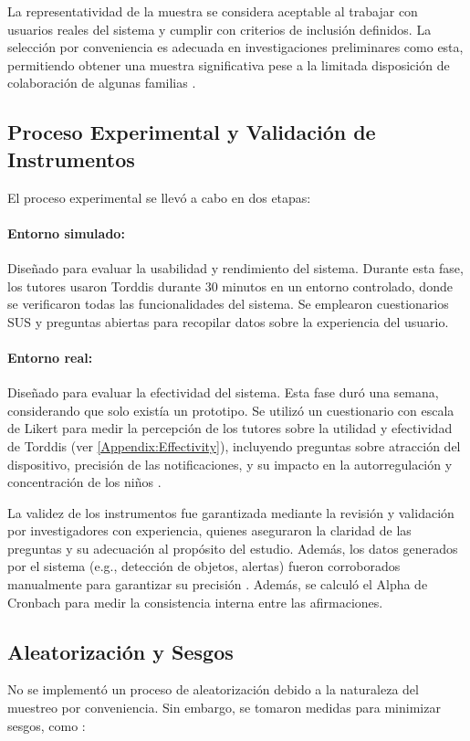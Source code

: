 \documentclass[a4paper,fleqn]{cas-sc}
\begin{document}
			La representatividad de la muestra se considera aceptable al trabajar con usuarios reales del sistema y cumplir con criterios de inclusión definidos. La selección por conveniencia es adecuada en investigaciones preliminares como esta, permitiendo obtener una muestra significativa pese a la limitada disposición de colaboración de algunas familias \citep{DiPietro2025Meta}.
				
		\subsection{Proceso Experimental y Validación de Instrumentos}
			El proceso experimental se llevó a cabo en dos etapas:
				
			\paragraph{Entorno simulado:} Diseñado para evaluar la usabilidad y rendimiento del sistema. Durante esta fase, los tutores usaron Torddis durante 30 minutos en un entorno controlado, donde se verificaron todas las funcionalidades del sistema. Se emplearon cuestionarios SUS y preguntas abiertas para recopilar datos sobre la experiencia del usuario.
			
			\paragraph{Entorno real:} Diseñado para evaluar la efectividad del sistema. Esta fase duró una semana, considerando que solo existía un prototipo. Se utilizó un cuestionario con escala de Likert para medir la percepción de los tutores sobre la utilidad y efectividad de Torddis (ver \ref{Appendix:Effectivity}), incluyendo preguntas sobre atracción del dispositivo, precisión de las notificaciones, y su impacto en la autorregulación y concentración de los niños \citep{Ackermans2025Young}.
				
			La validez de los instrumentos fue garantizada mediante la revisión y validación por investigadores con experiencia, quienes aseguraron la claridad de las preguntas y su adecuación al propósito del estudio. Además, los datos generados por el sistema (e.g., detección de objetos, alertas) fueron corroborados manualmente para garantizar su precisión \citep{Wang2025Development}. Además, se calculó el Alpha de Cronbach \citep{Forero2024Cronbach} para medir la consistencia interna entre las afirmaciones.
			
		\subsection{Aleatorización y Sesgos}
			No se implementó un proceso de aleatorización debido a la naturaleza del muestreo por conveniencia. Sin embargo, se tomaron medidas para minimizar sesgos, como \citep{Huang2025How}:
			
\end{document}
